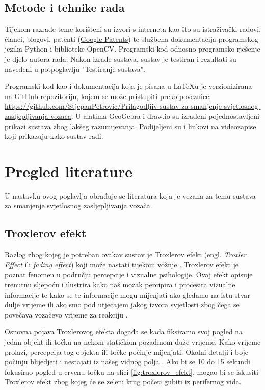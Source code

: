 \documentclass{foi}
\begin{document}
\section{Metode i tehnike rada}

Tijekom razrade teme korišteni su izvori s interneta kao što su istraživački radovi, članci, blogovi, patenti (\href{https://patents.google.com/}{Google Patents}) te službena dokumentacija programskog jezika Python i biblioteke OpenCV. Programski kod odnosno programsko rješenje je djelo autora rada. Nakon izrade sustava, sustav je testiran i rezultati su navedeni u potpoglavlju "Testiranje sustava".

Programski kod kao i dokumentacija koja je pisana u LaTeXu je verzionizirana na GitHub repozitoriju, kojem se može pristupiti preko poveznice: \url{https://github.com/StjepanPetrovic/Prilagodljiv-sustav-za-smanjenje-svjetlosnog-zasljepljivanja-vozaca}. U alatima GeoGebra i draw.io su izrađeni pojednostavljeni prikazi sustava zbog lakšeg razumijevanja. Podijeljeni su i linkovi na videozapise koji prikazuju kako sustav radi.

\chapter{Pregled literature}

U nastavku ovog poglavlja obrađuje se literatura koja je vezana za temu sustava za smanjenje svjetlosnog zasljepljivanja vozača.

\section{Troxlerov efekt}

Razlog zbog kojeg je potreban ovakav sustav je Troxlerov efekt (engl. \emph{Troxler Effect} ili \emph{fading effect}) koji može nastati tijekom vožnje \cite{Autoevolution2022}. Troxlerov efekt je poznat fenomen u području percepcije i vizualne psihologije. Ovaj efekt opisuje trenutnu sljepoću i ilustrira kako naš mozak percipira i procesira vizualne informacije te kako se te informacije mogu mijenjati ako gledamo na istu stvar dulje vrijeme ili ako smo pod utjecajem jakog izvora svjetlosti zbog čega se povečava vozačevo vrijeme za reakciju \cite[str. 208]{P2014}.

Osnovna pojava Troxlerovog efekta događa se kada fiksiramo svoj pogled na jedan objekt ili točku na nekom statičkom pozadinom duže vrijeme. Kako vrijeme prolazi, percepcija tog objekta ili točke počinje mijenjati. Okolni detalji i boje počinju blijedjeti i nestajati iz našeg vidnog polja \cite[str. 664]{Kanai2003}. Ako bi se 10 do 15 sekundi fokusirao pogled u crvenu točku na slici \ref{fig:troxlerov_efekt}, mogao bi se iskusiti Troxlerov efekt zbog kojeg će se zeleni krug početi gubiti iz perifernog vida.
\end{document}
